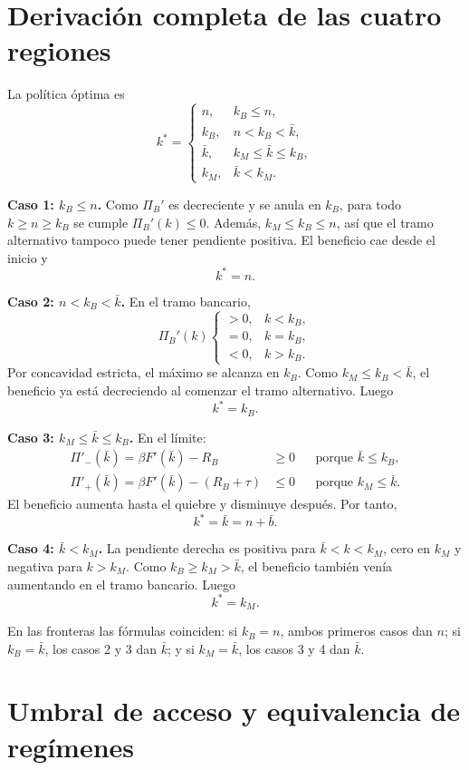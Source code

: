 \documentclass[11pt]{article}
\newcommand{\Rb}{R_B}
\newcommand{\kb}{k_B}
\newcommand{\km}{k_M}
\begin{document}
\newpage
\section{Derivación completa de las cuatro regiones}

La política óptima es
\[
\boxed{
k^*=\begin{cases}
n,&\kb\leq n,\\
\kb,&n<\kb<\bar k,\\
\bar k,&\km\leq\bar k\leq\kb,\\
\km,&\bar k<\km.
\end{cases}}
\]

\textbf{Caso 1: $\kb\leq n$.} Como $\Pi_B'$ es decreciente y se anula en
$\kb$, para todo $k\geq n\geq\kb$ se cumple $\Pi_B'(k)\leq0$. Además,
$\km\leq\kb\leq n$, así que el tramo alternativo tampoco puede tener pendiente
positiva. El beneficio cae desde el inicio y
\[
\boxed{k^*=n.}
\]

\textbf{Caso 2: $n<\kb<\bar k$.} En el tramo bancario,
\[
\Pi_B'(k)
\begin{cases}
>0,&k<\kb,\\
=0,&k=\kb,\\
<0,&k>\kb.
\end{cases}
\]
Por concavidad estricta, el máximo se alcanza en $\kb$. Como
$\km\leq\kb<\bar k$, el beneficio ya está decreciendo al comenzar el tramo
alternativo. Luego
\[
\boxed{k^*=\kb.}
\]

\textbf{Caso 3: $\km\leq\bar k\leq\kb$.} En el límite:
\begin{align*}
\Pi'_-(\bar k)=\beta F'(\bar k)-\Rb&\geq0
&&\text{porque }\bar k\leq\kb,\\
\Pi'_+(\bar k)=\beta F'(\bar k)-(\Rb+\tau)&\leq0
&&\text{porque }\km\leq\bar k.
\end{align*}
El beneficio aumenta hasta el quiebre y disminuye después. Por tanto,
\[
\boxed{k^*=\bar k=n+\bar b.}
\]

\textbf{Caso 4: $\bar k<\km$.} La pendiente derecha es positiva para
$\bar k<k<\km$, cero en $\km$ y negativa para $k>\km$. Como
$\kb\geq\km>\bar k$, el beneficio también venía aumentando en el tramo
bancario. Luego
\[
\boxed{k^*=\km.}
\]

En las fronteras las fórmulas coinciden: si $\kb=n$, ambos primeros casos dan
$n$; si $\kb=\bar k$, los casos 2 y 3 dan $\bar k$; y si $\km=\bar k$, los
casos 3 y 4 dan $\bar k$.

\newpage
\section{Umbral de acceso y equivalencia de regímenes}
\end{document}
